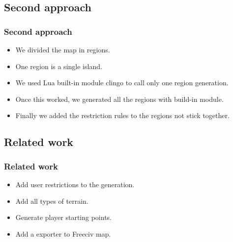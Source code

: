 \subsection{Second approach}

\begin{frame}
\frametitle{Second approach}

\begin{itemize}
	\item<1-> We divided the map in regions.
	\item<2-> One region is a single island.
	\item<3-> We used Lua built-in module clingo to call only one region generation.
	\item<4-> Once this worked, we generated all the regions with build-in module.
	\item<5-> Finally we added the restriction rules to the regions not stick together.
\end{itemize}

\end{frame}

\subsection{Related work}

\begin{frame}
\frametitle{Related work}

\begin{itemize}
	\item<1-> Add user restrictions to the generation.
	\item<2-> Add all types of terrain.
	\item<3-> Generate player starting points.
	\item<4-> Add a exporter to Freeciv map.
\end{itemize}

\end{frame}